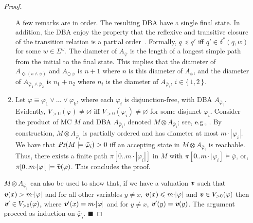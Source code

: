 \documentclass{llncs}
\renewcommand{\Pr}{\mbox{\rm Pr}}
\renewcommand{\Pr}{\mbox{\sl Pr}}
\newcommand{\set}[1]{\{ \, #1 \, \}}
\newcommand{\Next}{\bigcirc \, }
\newcommand{\X}{\Next}
\renewcommand{\leq}{\leqslant}
\renewcommand{\emptyset}{\varnothing}
\renewcommand{\a}[1]{\textbf{\textit{#1}}}
\newcommand{\ve}{{{\a v}}}
\newcommand{\de}{\Diamond}
\begin{document}
\begin{proof}
\begin{enumerate}
A few remarks are in order.
The resulting DBA have a single final state.
In addition, the DBA enjoy the property that the reflexive and transitive closure of the transition relation is a partial order~\cite{DBLP:journals/tocl/AlurT04}.
Formally, $q \preceq q'$ iff $q' \in\delta^*(q,w)$ for some $w \in \Sigma^\omega$. 
The diameter of $A_{\bar \varphi}$ is the length of a longest simple path from the initial to the final state.
This implies that
the diameter of $A_{\de (a \wedge \bar \varphi)}$ and  $A_{\X\! \bar \varphi}$ is $n{+}1$ where $n$ is this diameter of $A_{\bar \varphi}$, and
the diameter of $A_{\bar \varphi_1 \wedge \bar \varphi_2}$ is $n_1+n_2$ where $n_i$ is the diameter of $A_{\bar \varphi_i}$, $i \in \set{1,2}$.
\item
Let $\varphi \equiv \varphi_1 \vee \ldots \vee \varphi_k$, where each $\varphi_i$ is disjunction-free, with DBA $A_{\bar \varphi_i}$.
Evidently, $V_{>0}(\varphi) \neq \emptyset$ iff $V_{>0}(\varphi_i) \neq \emptyset$ for some disjunct $\varphi_i$.
Consider the product of MC $M$ and DBA $A_{\bar\varphi_i}$, denoted $M \otimes A_{\bar\varphi_i}$; see, e.g., \cite[Def.\ 10.50]{DBLP:books/daglib/0020348}.
By construction, $M\otimes A_{\bar\varphi_i}$ is partially ordered and has diameter at most $m{\cdot}|\varphi_i|$.
We have that $\Pr(M\models \bar \varphi_i) > 0$ iff an accepting state in $M \otimes A_{\bar\varphi_i}$ is reachable.
Thus, there exists a finite path $\pi[0..m{\cdot}|\varphi_i|]$ in $M$ with $\pi[0..m{\cdot}|\varphi_i] \models \bar \varphi$, or, $\pi[0..m{\cdot}|\varphi|] \models \bar\ve(\varphi)$.
This concludes the proof. 
\end{enumerate}
$M\otimes A_{\bar\varphi_i} $ can also be used to show that, if we have a valuation $\ve$ such that $\ve(x)>m{\cdot}|\varphi|$ and for all other variables $y\neq x$, $\ve(x)\leq m{\cdot}|\varphi|$ and 
$\ve \in V_{>0}(\varphi)$ then $\ve' \in V_{>0}(\varphi)$, where $\ve'(x)=m{\cdot}|\varphi|$ and for $y\neq x$, $\ve'(y)=\ve(y)$. The argument proceed as induction on $\bar\varphi_i$.
\hfill $\blacksquare$
\end{proof}
\end{document}
